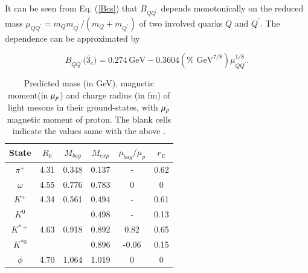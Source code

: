 \documentclass[prd,twocolumn,floatfix,nofootinbib]{revtex4}
\begin{document}
It can be seen from Eq. (\ref{Bcs}) that $B_{QQ^{\prime }}$ depends
monotonically on the reduced mass $\mu _{QQ^{\prime }}=m_{Q}m_{Q^{\prime
}}/(m_{Q}+m_{Q^{\prime }})$ of two involved quarks $Q$ and $Q^{\prime }$.
The dependence can be approximated by

\begin{equation}
B_{QQ^{\prime }}\text{(}\bar{3}_{c}\text{)}=0.274\,\text{GeV}-0.3604(\text{%
GeV}^{7/8})\mu _{QQ^{\prime }}^{1/8}\text{.}  \label{BQQ}
\end{equation}

\renewcommand{\tabcolsep}{0.37cm} \renewcommand{\arraystretch}{1.3}
\begin{table}[!htb]
\caption{Predicted mass (in GeV), magnetic moment(in $\protect\mu_{p}$) and
charge radius (in fm) of light mesons in their ground-states, with $\protect%
\mu_{p}$ magnetic moment of proton. The blank cells indicate the values same
with the above .}
\label{tab:lightmeson}%
\begin{tabular}{cccccc}
\hline\hline
\textrm{State} & $R_{0}$ & $M_{bag}$ & $M_{exp}$ & $\mu_{bag}/\mu_{p}$ & $%
r_{E}$ \\ \hline
$\pi^{+}$ & 4.31 & 0.348 & 0.137 & - & 0.62 \\
$\omega$ & 4.55 & 0.776 & 0.783 & 0 & 0 \\
$K^{+}$ & 4.34 & 0.561 & 0.494 & - & 0.61 \\
$K^{0}$ &  &  & 0.498 & - & 0.13 \\
$K^{\ast +}$ & 4.63 & 0.918 & 0.892 & 0.82 & 0.65 \\
$K^{\ast 0}$ &  &  & 0.896 & -0.06 & 0.15 \\
$\phi$ & 4.70 & 1.064 & 1.019 & 0 & 0 \\ \hline\hline
\end{tabular}%
\end{table}
\end{document}
